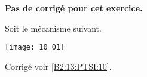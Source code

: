 \normaltrue \difficilefalse \tdifficilefalse
\correctionfalse

\setcounter{question}{0}
\ifcorrection
\else
\textbf{Pas de corrigé pour cet exercice.}
\fi

\ifprof
\else
Soit le mécanisme suivant.
\begin{center}
\texttt{[image: 10\_01]}
\end{center}

\fi



\ifprof

\else
\fi


\ifprof
\else
\footnotesize
\ifcolle
\else

\fi

\normalsize
\begin{flushright}
\footnotesize{Corrigé  voir \ref{B2:13:PTSI:10}.}
\end{flushright}%
\fi